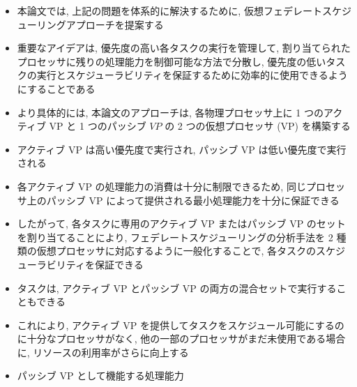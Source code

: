 \begin{frame}{}
    \begin{itemize}
        \item 本論文では, 上記の問題を体系的に解決するために, 仮想フェデレートスケジューリングアプローチを提案する
\item 重要なアイデアは, 優先度の高い各タスクの実行を管理して, 割り当てられたプロセッサに残りの処理能力を制御可能な方法で分散し, 優先度の低いタスクの実行とスケジューラビリティを保証するために効率的に使用できるようにすることである
\item より具体的には, 本論文のアプローチは, 各物理プロセッサ上に 1 つのアクティブ VP と 1 つのパッシブ $V P$ の 2 つの仮想プロセッサ (VP) を構築する
\item アクティブ VP は高い優先度で実行され, パッシブ VP は低い優先度で実行される
\item 各アクティブ VP の処理能力の消費は十分に制限できるため, 同じプロセッサ上のパッシブ VP によって提供される最小処理能力を十分に保証できる
\item したがって, 各タスクに専用のアクティブ VP またはパッシブ VP のセットを割り当てることにより, フェデレートスケジューリングの分析手法を 2 種類の仮想プロセッサに対応するように一般化することで, 各タスクのスケジューラビリティを保証できる
\item タスクは, アクティブ VP とパッシブ VP の両方の混合セットで実行することもできる
\item これにより, アクティブ VP を提供してタスクをスケジュール可能にするのに十分なプロセッサがなく, 他の一部のプロセッサがまだ未使用である場合に, リソースの利用率がさらに向上する
\item パッシブ VP として機能する処理能力
    \end{itemize}
\end{frame}
